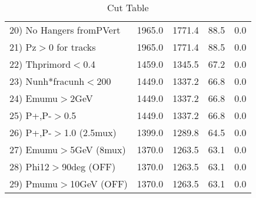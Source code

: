 \begin{table}[h!]
\begin{tabular}{||l||r|r|r|r||}
 20) No Hangers fromPVert &      1965.0 &      1771.4 &        88.5 &         0.0 \\
 21) Pz$>$0 for tracks    &      1965.0 &      1771.4 &        88.5 &         0.0 \\
 22) Thprimord$<$0.4      &      1459.0 &      1345.5 &        67.2 &         0.0 \\
 23) Nunh*fracunh$<$200   &      1449.0 &      1337.2 &        66.8 &         0.0 \\
 24) Emumu$>$2GeV         &      1449.0 &      1337.2 &        66.8 &         0.0 \\
 25) P+,P-$>$0.5          &      1449.0 &      1337.2 &        66.8 &         0.0 \\
 26) P+,P-$>$1.0 (2.5mux) &      1399.0 &      1289.8 &        64.5 &         0.0 \\
 27) Emumu$>$5GeV  (8mux) &      1370.0 &      1263.5 &        63.1 &         0.0 \\
 28) Phi12$>$90deg  (OFF) &      1370.0 &      1263.5 &        63.1 &         0.0 \\
 29) Pmumu$>$10GeV  (OFF) &      1370.0 &      1263.5 &        63.1 &         0.0 \\
 \hline
 \hline
 \end{tabular}
 \caption{Cut Table \cohrp  }
 \label{tab-cut_crhop}
 \end{table}
